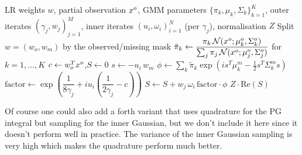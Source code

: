 \begin{algorithm}[H]
\caption{PCPG (unified)}
\label{alg:pcpg}
\begin{algorithmic}[1]
\Require LR weights $w$, partial observation $x^o$,
GMM parameters $\{\pi_k, \mu_k, \Sigma_k\}_{k=1}^{K}$,
outer iterates $(\gamma_j, w_j)_{j=1}^{M}$, inner iterates $(u_i, \omega_i)_{i=1}^{N}$ (per $\gamma_j$), normalisation $Z$
\State Split $w = (w_o, w_m)$ by the observed/missing mask
\State $\tilde{\pi}_k \gets \dfrac{\pi_k \, \mathcal{N}(x^o;\mu_k^o,\Sigma_k^o)}{\sum_{j}\pi_j \,\mathcal{N}(x^o;\mu_j^o,\Sigma_j^o)}$ \hfill for $k=1,\dots,K$
\State $c \gets w_o^T x^o$,\quad $S \gets 0$
    \State $s \gets -u_i\, w_m$
    \State $\phi \gets \sum_{k} \tilde{\pi}_k \exp \!\left( i s^T \mu_k^m - \tfrac{1}{2} s^T \Sigma_k^m s \right)$
    \State $\mathrm{factor} \gets \exp \!\left( \dfrac{1}{8\gamma_j} + i u_i \left( \dfrac{1}{2\gamma_j} - c \right) \right)$
    \State $S \gets S + w_j\, \omega_i\, \mathrm{factor} \cdot \phi$
  \EndFor
\EndFor
\State \Return $Z \cdot \mathrm{Re}(S)$
\end{algorithmic}
\end{algorithm}

Of course one could also add a forth variant that uses quadrature for the PG integral but sampling for the inner Gaussian, but we don't include it here since it doesn't perform well in practice. 
The variance of the inner Gaussian sampling is very high which makes the quadrature perform much better.